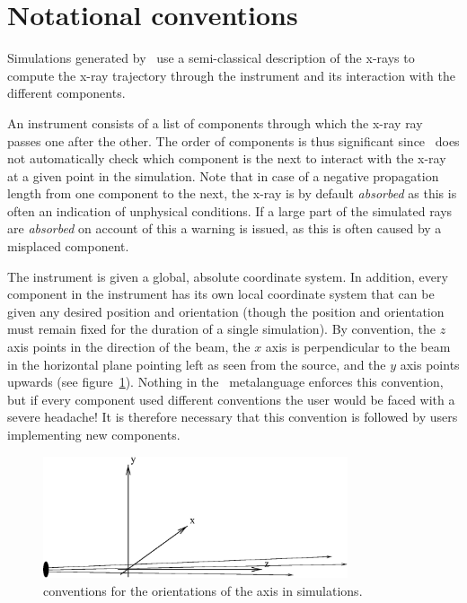 \section{Notational conventions}

Simulations generated by \MCX\ use a semi-classical description of the
x-rays to compute the x-ray trajectory through the instrument and its
interaction with the different components. 

An instrument consists of a list of components through which the x-ray
ray passes one after the other. The order of components is thus significant
since \MCX\ does not automatically check which component is the next to
interact with the x-ray at a given point in the simulation. Note
that in case of a negative propagation length from one component to the
next, the x-ray is by default \emph{absorbed} as this is often
an indication of unphysical conditions. If a large part of the simulated rays are \emph{absorbed}
on account of this a warning is issued, as this is often caused by a misplaced component.

The instrument is given a global, absolute coordinate system. In
addition, every component in the instrument has its own local coordinate
system that can be given any desired position and orientation (though
the position and orientation must remain fixed for the duration of a
single simulation). 
By convention, the $z$ axis points in the direction of the beam, the $x$ axis
is perpendicular to the beam in the horizontal plane pointing left as seen
from the source, and the $y$ axis points upwards (see figure~\ref{f:axis}).
Nothing in the \MCX\ metalanguage enforces this convention, but if every component used
different conventions the user would be faced with a severe headache! It is
therefore necessary that this convention is followed by users implementing
new components.
\begin{figure}
  \begin{center}
    \includegraphics[width=0.8\textwidth]{figures/axis-conventions.eps}
  \end{center}
\caption{conventions for the orientations of the axis in simulations.}
\label{f:axis}
\end{figure}


